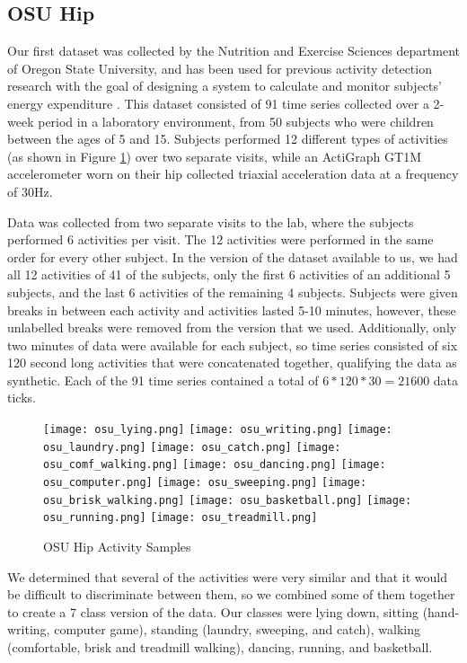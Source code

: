 \subsection{OSU Hip}
Our first dataset was collected by the Nutrition and Exercise Sciences department of
Oregon State University, and has been used for previous activity detection research
with the goal of designing a system to calculate and monitor subjects' energy expenditure
\cite{trost12} \cite{zheng12}.
This dataset consisted of 91 time series collected over a 2-week period in a
laboratory environment, from 50 subjects who were children between the ages of 5 and 15.
Subjects performed 12 different types of activities (as shown in Figure \ref{fig:osu_activities})
over two separate visits, while an ActiGraph GT1M accelerometer worn on their hip 
collected triaxial acceleration data at a frequency of 30Hz.

Data was collected from two separate visits to the lab, where the subjects performed 6 activities per visit.
The 12 activities were performed in the same order for every other subject.
In the version of the dataset available to us, we had all 12 activities of
41 of the subjects, only the first 6 activities of an additional 5 subjects,
and the last 6 activities of the remaining 4 subjects.
Subjects were given breaks in between each activity and activities lasted 5-10
minutes, however, these unlabelled breaks were removed from the version that we
used. Additionally, only two minutes of data were available for each subject, so 
time series consisted of six 120 second long activities that were concatenated together,
qualifying the data as synthetic. Each of the 91 time series contained a total of
$6*120*30 = 21600$ data ticks.

\begin{figure}
 \centering
 \texttt{[image: osu\_lying.png]}
 \texttt{[image: osu\_writing.png]}
 \texttt{[image: osu\_laundry.png]}
 \texttt{[image: osu\_catch.png]}
 \texttt{[image: osu\_comf\_walking.png]}
 \texttt{[image: osu\_dancing.png]}
 \texttt{[image: osu\_computer.png]}
 \texttt{[image: osu\_sweeping.png]}
 \texttt{[image: osu\_brisk\_walking.png]}
 \texttt{[image: osu\_basketball.png]}
 \texttt{[image: osu\_running.png]}
 \texttt{[image: osu\_treadmill.png]}
 \caption{OSU Hip Activity Samples}
 \label{fig:osu_activities}
\end{figure}

We determined that several of the activities were very similar and that
it would be difficult to discriminate between them, so we combined some of them together to
create a 7 class version of the data.
Our classes were lying down, sitting (hand-writing, computer game),
standing (laundry, sweeping, and catch), walking (comfortable, brisk and treadmill walking),
dancing, running, and basketball.

